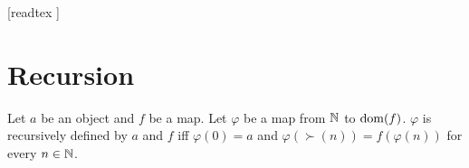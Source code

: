 \documentclass[10pt]{article}
\begin{document}
  \begin{imports}
    \begin{forthel}
      [readtex ]
    \end{forthel}
  \end{imports}


  \section{Recursion}

  \begin{forthel}
    \begin{definition}
      Let $a$ be an object and $f$ be a map.
      Let $\varphi$ be a map from $\mathbb{N}$ to $\operatorname{dom}(f)$.
      $\varphi$ is recursively defined by $a$ and $f$ iff $\varphi(0) = a$ and
      $\varphi(\succ(n)) = f(\varphi(n))$ for every $n \in \mathbb{N}$.
    \end{definition}
  \end{forthel}
\end{document}
